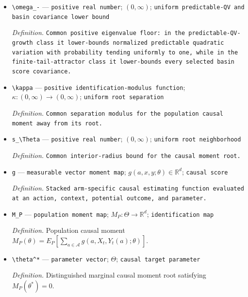 \documentclass{article}
\begin{document}
\begin{itemize}
  \par\smallskip\noindent\emph{Definition.} \texttt{Common Lipschitz modulus for the policy map.}
  \item \texttt{\textbackslash{}\allowbreak{}omega\_\allowbreak{}-\allowbreak{}} --- \texttt{positive real number}; \((0,\infty)\); \texttt{uniform predictable-\allowbreak{}QV and basin covariance lower bound}
  \par\smallskip\noindent\emph{Definition.} \texttt{Common positive eigenvalue floor:\allowbreak{} in the predictable-\allowbreak{}QV-\allowbreak{}growth class it lower-\allowbreak{}bounds normalized predictable quadratic variation with probability tending uniformly to one,\allowbreak{} while in the finite-\allowbreak{}tail-\allowbreak{}attractor class it lower-\allowbreak{}bounds every selected basin score covariance.}
  \item \texttt{\textbackslash{}\allowbreak{}kappa} --- \texttt{positive identification-\allowbreak{}modulus function}; \(\kappa:(0,\infty)\to(0,\infty)\); \texttt{uniform root separation}
  \par\smallskip\noindent\emph{Definition.} \texttt{Common separation modulus for the population causal moment away from its root.}
  \item \texttt{s\_\allowbreak{}\textbackslash{}\allowbreak{}Theta} --- \texttt{positive real number}; \((0,\infty)\); \texttt{uniform root neighborhood}
  \par\smallskip\noindent\emph{Definition.} \texttt{Common interior-\allowbreak{}radius bound for the causal moment root.}
  \item \texttt{g} --- \texttt{measurable vector moment map}; \(g(a,x,y;\theta)\in\mathbb R^d\); \texttt{causal score}
  \par\smallskip\noindent\emph{Definition.} \texttt{Stacked arm-\allowbreak{}specific causal estimating function evaluated at an action,\allowbreak{} context,\allowbreak{} potential outcome,\allowbreak{} and parameter.}
  \item \texttt{M\_\allowbreak{}P} --- \texttt{population moment map}; \(M_P:\Theta\to\mathbb R^d\); \texttt{identification map}
  \par\smallskip\noindent\emph{Definition.} Population causal moment \(M_P(\theta)=E_P[\sum_{a\in\mathcal A}g(a,X_t,Y_t(a);\theta)]\).
  \item \texttt{\textbackslash{}\allowbreak{}theta\textasciicircum{}*} --- \texttt{parameter vector}; \(\Theta\); \texttt{causal target parameter}
  \par\smallskip\noindent\emph{Definition.} Distinguished marginal causal moment root satisfying \(M_P(\theta^*)=0\).

\end{itemize}
\end{document}
